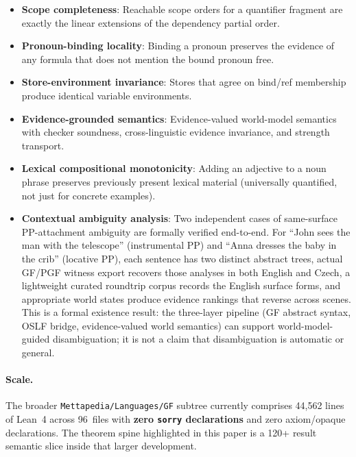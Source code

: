 \documentclass[11pt]{article}
\newcommand{\code}[1]{\texttt{#1}}
\newcommand{\GF}{\textup{GF}}
\begin{document}
\begin{itemize}
\item \textbf{Scope completeness}: Reachable scope orders for a
  quantifier fragment are exactly the linear extensions of the
  dependency partial order.
\item \textbf{Pronoun-binding locality}: Binding a pronoun preserves
  the evidence of any formula that does not mention the bound pronoun free.
\item \textbf{Store-environment invariance}: Stores that agree on
  bind/ref membership produce identical variable environments.
\item \textbf{Evidence-grounded semantics}: Evidence-valued world-model
  semantics with checker soundness, cross-linguistic evidence invariance,
  and strength transport.
\item \textbf{Lexical compositional monotonicity}: Adding an adjective
  to a noun phrase preserves previously present lexical material
  (universally quantified, not just for concrete examples).
\item \textbf{Contextual ambiguity analysis}: Two independent cases of
  same-surface PP-attachment ambiguity are formally verified end-to-end.
  For ``John sees the man with the telescope'' (instrumental PP) and
  ``Anna dresses the baby in the crib'' (locative PP), each sentence has
  two distinct abstract trees, actual \GF{}/PGF witness export recovers those
  analyses in both English and Czech, a lightweight curated roundtrip corpus
  records the English surface forms, and appropriate world states produce
  evidence rankings that reverse across scenes.  This is a formal existence
  result: the three-layer pipeline (GF abstract syntax, OSLF bridge,
  evidence-valued world semantics) can support world-model-guided
  disambiguation; it is not a claim that disambiguation is automatic or general.
\end{itemize}

\paragraph{Scale.}  The broader \code{Mettapedia/Languages/GF} subtree currently
comprises 44,562 lines of Lean~4 across 96~files with
\textbf{zero \code{sorry} declarations} and zero axiom/opaque declarations.
The theorem spine highlighted in this paper is a 120+ result semantic slice
inside that larger development.
\end{document}
